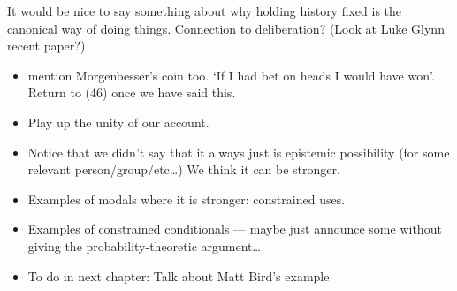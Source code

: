 It would be nice to say something about why holding history fixed is the
canonical way of doing things. Connection to deliberation? (Look at Luke
Glynn recent paper?)

\begin{itemize}
\item
  mention Morgenbesser's coin too. `If I had bet on heads I would have
  won'. Return to (46) once we have said this.
\item
  Play up the unity of our account.
\item
  Notice that we didn't say that it always just is epistemic possibility
  (for some relevant person/group/etc\ldots{}) We think it can be
  stronger.
\end{itemize}

\begin{itemize}
\item
  Examples of modals where it is stronger: constrained uses.
\item
  Examples of constrained conditionals --- maybe just announce some
  without giving the probability-theoretic argument\ldots{}
\item
  To do in next chapter: Talk about Matt Bird's example
\end{itemize}
